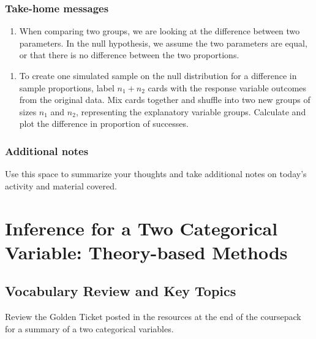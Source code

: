 \documentclass[
]{report}
\providecommand{\tightlist}{%
  \setlength{\itemsep}{0pt}\setlength{\parskip}{0pt}}
\begin{document}
\vspace{1in}

\subsection{Take-home messages}\label{take-home-messages-7}

\begin{enumerate}
\def\labelenumi{\arabic{enumi}.}
\tightlist
\item
  When comparing two groups, we are looking at the difference between two parameters. In the null hypothesis, we assume the two parameters are equal, or that there is no difference between the two proportions.
\end{enumerate}

\begin{enumerate}
\def\labelenumi{\arabic{enumi}.}
\setcounter{enumi}{1}
\tightlist
\item
  To create one simulated sample on the null distribution for a difference in sample proportions, label \(n_1 + n_2\) cards with the response variable outcomes from the original data. Mix cards together and shuffle into two new groups of sizes \(n_1\) and \(n_2\), representing the explanatory variable groups. Calculate and plot the difference in proportion of successes.
\end{enumerate}

\subsection{Additional notes}\label{additional-notes-7}

Use this space to summarize your thoughts and take additional notes on today's activity and material covered.

\newpage

\chapter{Inference for a Two Categorical Variable: Theory-based Methods}\label{inference-for-a-two-categorical-variable-theory-based-methods}

\section{Vocabulary Review and Key Topics}\label{vocabulary-review-and-key-topics-3}

Review the Golden Ticket posted in the resources at the end of the coursepack for a summary of a two categorical variables.
\end{document}
